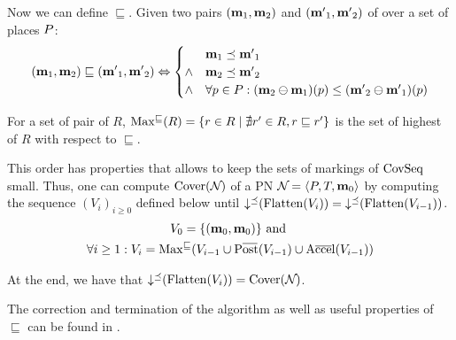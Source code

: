 Now we can define $\sqsubseteq$.
Given two pairs $(\mathbf{m}_1, \mathbf{m}_2)$ and $(\mathbf{m'}_1, \mathbf{m'}_2)$ of \omarks over a set of places $P$:
\[
  (\mathbf{m}_1, \mathbf{m}_2) \sqsubseteq (\mathbf{m'}_1, \mathbf{m'}_2) \Leftrightarrow
  \begin{cases}
    & \mathbf{m}_1 \preceq \mathbf{m'}_1 \\
    \wedge & \mathbf{m}_2 \preceq \mathbf{m'}_2 \\
    \wedge & \forall p \in P : (\mathbf{m}_2 \ominus \mathbf{m}_1)(p) \leq (\mathbf{m'}_2 \ominus \mathbf{m'}_1)(p)
  \end{cases}
\]

For a set of pair of \omarks $R$, $\operatorname{Max^\sqsubseteq}(R) = \{ r \in R \mid \nexists r' \in R, r \sqsubseteq r'\}$ is the set of highest \omark of $R$ with respect to $\sqsubseteq$.

This order has properties \citep{Geeraerts07} that allows to keep the sets of markings of $\operatorname{CovSeq}$ small.
Thus, one can compute $\operatorname{Cover}(\mathcal{N}_{})$ of a \ac{PN} $\defPN$ by computing the sequence $(V_i)_{i \geq 0}$ defined below until $\operatorname{\downarrow^\preceq}(\operatorname{Flatten}(V_i)) = \operatorname{\downarrow^\preceq}(\operatorname{Flatten}(V_{i-1}))$.
\begin{gather*}
  V_0 = \{(\mari, \mari)\} \text{ and } \\
  \forall i \geq 1 : V_i = \maxs{V_{i-1} \cup \Postb(V_{i-1}) \cup \Accelb(V_{i-1})}
\end{gather*}

At the end, we have that $\operatorname{\downarrow^\preceq}(\operatorname{Flatten}(V_i)) = \operatorname{Cover}(\mathcal{N}_{})$.

The correction and termination of the algorithm as well as useful properties of $\sqsubseteq$ can be found in \cite{Geeraerts07, Ganty09}.
